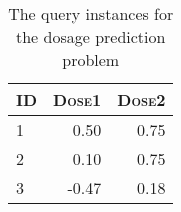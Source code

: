 \documentclass[--SOLUTION-OPTION--]{ditpaper}
\begin{document}
\begin{table}[h]
\begin{center}
\caption{The query instances for the dosage prediction problem}
\label{tab:dosagePrd}
\noindent\begin{tabular}{@{} l r r@{}}
\hline
				\textsc{ID} & \textsc{Dose1} & \textsc{Dose2} \\
\hline
		1 & 0.50 & 0.75 \\
		2 & 0.10 & 0.75 \\
		3 & -0.47 & 0.18 \\
\hline
\end{tabular}
\end{center}
\end{table}
\end{document}
